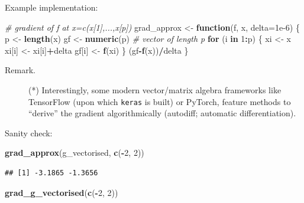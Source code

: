 \documentclass[10pt,b5paper,krantz1]{krantz}
\newenvironment{Shaded}{\begin{snugshade}}{\end{snugshade}}
\newcommand{\CommentTok}[1]{\textcolor[rgb]{0.37,0.37,0.37}{\textit{#1}}}
\newcommand{\ControlFlowTok}[1]{\textcolor[rgb]{0.27,0.27,0.27}{\textbf{#1}}}
\newcommand{\DataTypeTok}[1]{\textcolor[rgb]{0.27,0.27,0.27}{#1}}
\newcommand{\DecValTok}[1]{\textcolor[rgb]{0.06,0.06,0.06}{#1}}
\newcommand{\FloatTok}[1]{\textcolor[rgb]{0.06,0.06,0.06}{#1}}
\newcommand{\KeywordTok}[1]{\textcolor[rgb]{0.27,0.27,0.27}{\textbf{#1}}}
\newcommand{\NormalTok}[1]{#1}
\newcommand{\OperatorTok}[1]{\textcolor[rgb]{0.43,0.43,0.43}{\textbf{#1}}}
\newcommand{\StringTok}[1]{\textcolor[rgb]{0.5,0.5,0.5}{#1}}
\begin{document}
Example implementation:

\begin{Shaded}
\begin{Highlighting}[]
\CommentTok{# gradient of f at x=c(x[1],...,x[p])}
\NormalTok{grad_approx <-}\StringTok{ }\ControlFlowTok{function}\NormalTok{(f, x, }\DataTypeTok{delta=}\FloatTok{1e-6}\NormalTok{) \{}
\NormalTok{    p <-}\StringTok{ }\KeywordTok{length}\NormalTok{(x)}
\NormalTok{    gf <-}\StringTok{ }\KeywordTok{numeric}\NormalTok{(p) }\CommentTok{# vector of length p}
    \ControlFlowTok{for}\NormalTok{ (i }\ControlFlowTok{in} \DecValTok{1}\OperatorTok{:}\NormalTok{p) \{}
\NormalTok{        xi <-}\StringTok{ }\NormalTok{x}
\NormalTok{        xi[i] <-}\StringTok{ }\NormalTok{xi[i]}\OperatorTok{+}\NormalTok{delta}
\NormalTok{        gf[i] <-}\StringTok{ }\KeywordTok{f}\NormalTok{(xi)}
\NormalTok{    \}}
\NormalTok{    (gf}\OperatorTok{-}\KeywordTok{f}\NormalTok{(x))}\OperatorTok{/}\NormalTok{delta}
\NormalTok{\}}
\end{Highlighting}
\end{Shaded}

\begin{description}
\item[Remark.]
(*) Interestingly, some modern vector/matrix algebra frameworks
like TensorFlow (upon which \texttt{keras} is built) or PyTorch, feature
methods to ``derive'' the gradient algorithmically
(autodiff; automatic differentiation).
\end{description}

Sanity check:

\begin{Shaded}
\begin{Highlighting}[]
\KeywordTok{grad_approx}\NormalTok{(g_vectorised, }\KeywordTok{c}\NormalTok{(}\OperatorTok{-}\DecValTok{2}\NormalTok{, }\DecValTok{2}\NormalTok{))}
\end{Highlighting}
\end{Shaded}

\begin{verbatim}
## [1] -3.1865 -1.3656
\end{verbatim}

\begin{Shaded}
\begin{Highlighting}[]
\KeywordTok{grad_g_vectorised}\NormalTok{(}\KeywordTok{c}\NormalTok{(}\OperatorTok{-}\DecValTok{2}\NormalTok{, }\DecValTok{2}\NormalTok{))}
\end{Highlighting}
\end{Shaded}
\end{document}
